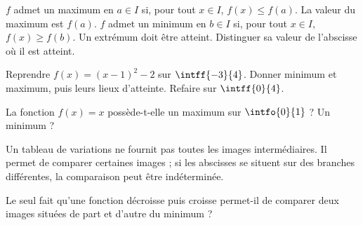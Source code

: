\begin{keypoint}[Définitions]
$f$ admet un maximum en $a\in I$ si, pour tout $x\in I$, $f(x)\leq f(a)$. La valeur du maximum est $f(a)$.
$f$ admet un minimum en $b\in I$ si, pour tout $x\in I$, $f(x)\geq f(b)$.
Un extrémum doit être atteint. Distinguer sa valeur de l'abscisse où il est atteint.
\end{keypoint}
\begin{example}Reprendre $f(x)=(x-1)^2-2$ sur $\intff{-3}{4}$. Donner minimum et maximum, puis leurs lieux d'atteinte. Refaire sur $\intff{0}{4}$.\end{example}
\begin{example}La fonction $f(x)=x$ possède-t-elle un maximum sur $\intfo{0}{1}$ ? Un minimum ?\end{example}
\begin{keypoint}
Un tableau de variations ne fournit pas toutes les images intermédiaires. Il permet de comparer certaines images ; si les abscisses se situent sur des branches différentes, la comparaison peut être indéterminée.
\end{keypoint}
\begin{example}Le seul fait qu'une fonction décroisse puis croisse permet-il de comparer deux images situées de part et d'autre du minimum ?\end{example}

